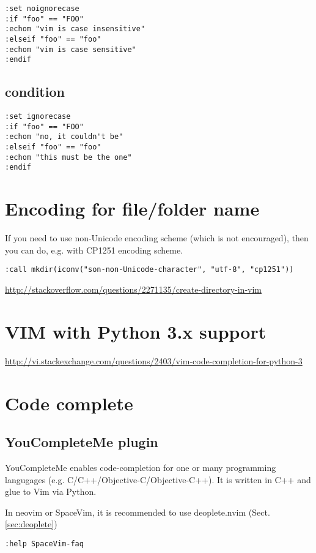 \begin{verbatim}
:set noignorecase
:if "foo" == "FOO"
:echom "vim is case insensitive"
:elseif "foo" == "foo"
:echom "vim is case sensitive"
:endif
\end{verbatim}

\subsection{condition}


\begin{verbatim}
:set ignorecase
:if "foo" == "FOO"
:echom "no, it couldn't be"
:elseif "foo" == "foo"
:echom "this must be the one"
:endif
\end{verbatim}

\section{Encoding for file/folder name}

If you need to use non-Unicode encoding scheme (which is not encouraged), then
you can do, e.g. with CP1251 encoding scheme.
\begin{verbatim}
:call mkdir(iconv("son-non-Unicode-character", "utf-8", "cp1251"))
\end{verbatim}
\url{http://stackoverflow.com/questions/2271135/create-directory-in-vim}

\section{VIM with Python 3.x support}
\label{sec:vim-Python-3.x}
\url{http://vi.stackexchange.com/questions/2403/vim-code-completion-for-python-3}


\section{Code complete}



\subsection{YouCompleteMe plugin}
\label{sec:YouCompleteMe}

YouCompleteMe enables code-completion for one or many programming langugages
(e.g. C/C++/Objective-C/Objective-C++).
It is written in C++ and glue to Vim via Python.

In neovim or SpaceVim, it is recommended to use deoplete.nvim
(Sect.\ref{sec:deoplete})
\begin{verbatim}
:help SpaceVim-faq
\end{verbatim}

